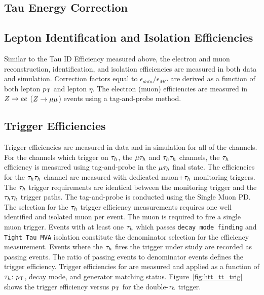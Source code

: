 \subsection{Tau Energy Correction}




\subsection{Lepton Identification and Isolation Efficiencies}
Similar to the Tau ID Efficiency measured above, the electron and muon reconstruction, identification,
and isolation efficiencies are measured in both data and simulation. Correction factors equal to
$\epsilon_{data}/\epsilon_{MC}$ are derived as a function of both lepton $p_\mathrm{T}$ and lepton $\eta$.
The electron (muon) efficiencies are measured in $Z\to ee$ ($Z\to\mu\mu$) events using a tag-and-probe
method.


\subsection{Trigger Efficiencies}
Trigger efficiencies are measured in data and in simulation for all of the channels. For the channels
which trigger on $\tau_{h}$, the $\mu\tau_{h}$ and $\tau_{h}\tau_{h}$ channels, the $\tau_{h}$ efficiency is measured
using tag-and-probe in the $\mu\tau_{h}$ final state. The efficiencies for the $\tau_{h}\tau_{h}$ channel
are measured with dedicated muon+$\tau_{h}$ monitoring triggers. The $\tau_{h}$ trigger requirements
are identical between the monitoring trigger and the $\tau_{h}\tau_{h}$ trigger paths. The tag-and-probe
is conducted using the Single Muon PD. The selection for the $\tau_{h}$ trigger efficiency measurements 
requires one well identified and isolated muon per event. The muon is required to fire a single muon trigger.
Events with at least one $\tau_{h}$ which passes \texttt{decay mode finding} and \texttt{Tight Tau MVA} isolation
constitute the denominator selection for the efficiency measurement. Events where the $\tau_{h}$
fires the trigger under study are recorded as passing events. The ratio of passing events to
denominator events defines the trigger efficiency. Trigger efficiencies for are measured and applied as 
a function of $\tau_{h}$: $p_\mathrm{T}$, decay mode, and generator matching status. Figure~\ref{fig:htt_tt_trig}
shows the trigger efficiency versus $p_\mathrm{T}$ for the double-$\tau_{h}$ trigger.


